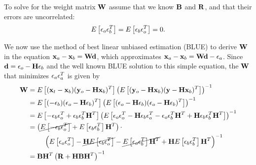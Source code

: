 To solve for the weight matrix $\mbW$ assume that we know $\mbB$ and $\mbR$, and that their errors are uncorrelated:
\begin{equation} \expv{ \mbe_o \mbe_b ^T } = \expv{\mbe_b\mbe_o ^T} = 0 . \end{equation}

We now use the method of best linear unbiased estimation (BLUE) to derive $\mbW$ in the equation $\mbx_a - \mbx _b = \mbW \mbd$, which approximates $\mbx_a - \mbx_b = \mbW \mbd - \mbe_a$.
Since $\mbd = \mbe_o - \mbH \mbe_b$ and the well known BLUE solution to this simple equation, the $\mbW$ that minimizes $\mbe_a \mbe_a ^T$ is given by
\begin{align*} \mbW &= E\left [ ( \mbx _t - \mbx _b ) ( \mby _o - \mbH \mbx _b )^T \right] \left (E \left [ (\mby _o - \mbH \mbx _b)(\mby - \mbH \mbx _b)^T    \right ] \right ) ^{-1}\\
&= E\left [ (- \mbe _b ) (\mbe _o  - \mbH \mbe _b ) ^T \right ] \left ( E \left [ (\mbe _o - \mbH \mbe _b )( \mbe _o - \mbH \mbe _b ) ^T \right ] \right ) ^{-1} \\
&= E \left [ - \mbe _b \mbe _o ^T + \mbe _b \mbe _b ^T \mbH ^T \right ] \left ( E \left [ \mbe _o \mbe_o ^T - \mbH \mbe _b \mbe_o ^T - \mbe _o \mbe _b ^T \mbH ^T + \mbH \mbe _b \mbe _b ^T \mbH ^T \right ] \right ) ^{-1}\\
&= \left ( \cancel{E\left [ - \mbe _b \mbe _o ^T \right ]} + E \left [ \mbe _b \mbe _b ^T \right ] \mbH ^T \right ) \cdot \\
& ~~~~~~~\left ( E \left [ \mbe _o \mbe _o ^T \right ] - \cancel{\mbH E\left [ \mbe _b \mbe _o ^T \right ]} - \cancel{E \left [ \mbe _o \mbe _b ^T \right ] \mbH ^T } + \mbH E \left [ \mbe _b \mbe _b ^T \right ] \mbH ^T \right ) ^{-1}\\
&= \mbB \mbH ^T \left ( \mbR + \mbH \mbB \mbH ^T \right ) ^{-1}  \end{align*}

